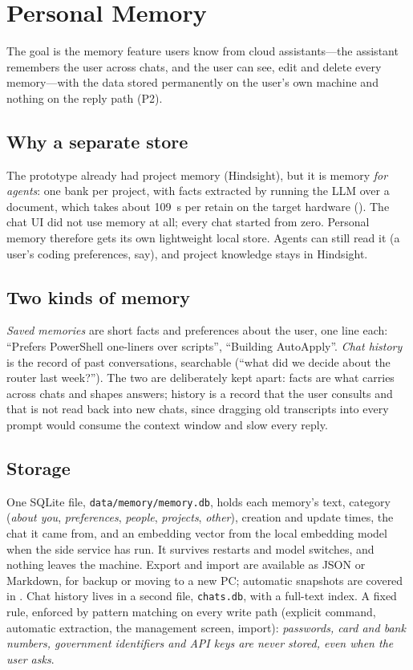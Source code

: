 \section{Personal Memory}
\label{sec:memory}

The goal is the memory feature users know from cloud assistants---the assistant remembers the user across chats, and the user can see, edit and delete every memory---with the data stored permanently on the user's own machine and nothing on the reply path (P2).

\subsection{Why a separate store}

The prototype already had project memory (Hindsight), but it is memory \emph{for agents}: one bank per project, with facts extracted by running the LLM over a document, which takes about 109~s per retain on the target hardware (). The chat UI did not use memory at all; every chat started from zero. Personal memory therefore gets its own lightweight local store. Agents can still read it (a user's coding preferences, say), and project knowledge stays in Hindsight.

\subsection{Two kinds of memory}

\emph{Saved memories} are short facts and preferences about the user, one line each: ``Prefers PowerShell one-liners over scripts'', ``Building \hivi{} AutoApply''. \emph{Chat history} is the record of past conversations, searchable (``what did we decide about the router last week?''). The two are deliberately kept apart: facts are what carries across chats and shapes answers; history is a record that the user consults and that is not read back into new chats, since dragging old transcripts into every prompt would consume the context window and slow every reply.

\subsection{Storage}

One SQLite file, \texttt{data/memory/memory.db}, holds each memory's text, category (\emph{about you}, \emph{preferences}, \emph{people}, \emph{projects}, \emph{other}), creation and update times, the chat it came from, and an embedding vector from the local embedding model when the side service has run. It survives restarts and model switches, and nothing leaves the machine. Export and import are available as JSON or Markdown, for backup or moving to a new PC; automatic snapshots are covered in . Chat history lives in a second file, \texttt{chats.db}, with a full-text index. A fixed rule, enforced by pattern matching on every write path (explicit command, automatic extraction, the management screen, import): \emph{passwords, card and bank numbers, government identifiers and API keys are never stored, even when the user asks}.

